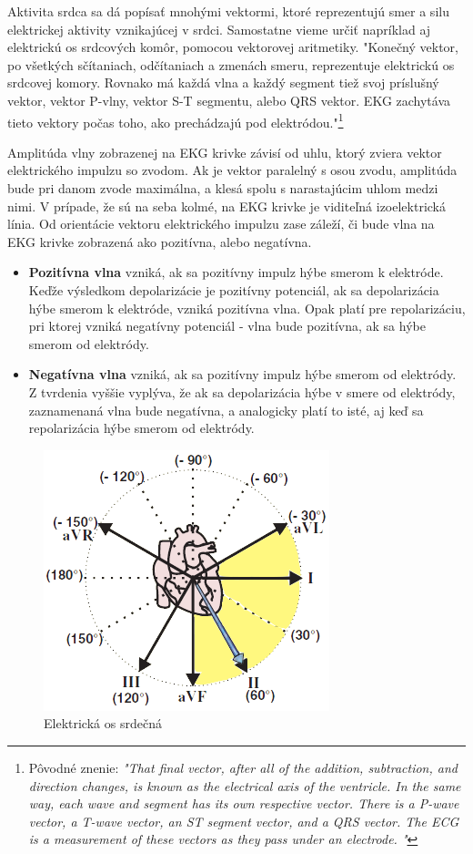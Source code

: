 Aktivita srdca sa dá popísať mnohými vektormi, ktoré reprezentujú smer a silu elektrickej aktivity vznikajúcej v srdci. Samostatne vieme určiť napríklad aj elektrickú os srdcových komôr, pomocou vektorovej aritmetiky. "Konečný vektor, po všetkých sčítaniach, odčítaniach a zmenách smeru, reprezentuje elektrickú os srdcovej komory. Rovnako má každá vlna a každý segment tiež svoj príslušný vektor, vektor P-vlny, vektor S-T segmentu, alebo QRS vektor. EKG zachytáva tieto vektory počas toho, ako prechádzajú pod elektródou."\footnote{Pôvodné znenie: \textit{"That final vector, after all of the addition, subtraction, and direction changes, is known as the electrical axis of the ventricle. In the same way, each wave and segment has its own respective vector. There is a P-wave vector, a T-wave vector, an ST segment vector, and a QRS vector. The ECG is a measurement of these vectors as they pass under an electrode. "}}\cite{garcia201512}

Amplitúda vlny zobrazenej na EKG krivke závisí od uhlu, ktorý zviera vektor elektrického impulzu so zvodom. Ak je vektor paralelný s osou zvodu, amplitúda bude pri danom zvode maximálna, a klesá spolu s narastajúcim uhlom medzi nimi. V prípade, že sú na seba kolmé, na EKG krivke je viditeľná izoelektrická línia. Od orientácie vektoru elektrického impulzu zase záleží, či bude vlna na EKG krivke zobrazená ako pozitívna, alebo negatívna. 
\begin{itemize}
    \item \textbf{Pozitívna vlna} vzniká, ak sa pozitívny impulz hýbe smerom k elektróde. Keďže výsledkom depolarizácie je pozitívny potenciál, ak sa depolarizácia hýbe smerom k elektróde, vzniká pozitívna vlna. Opak platí pre repolarizáciu, pri ktorej vzniká negatívny potenciál - vlna bude pozitívna, ak sa hýbe smerom od elektródy.
    \item \textbf{Negatívna vlna} vzniká, ak sa pozitívny impulz hýbe smerom od elektródy. Z tvrdenia vyššie vyplýva, že ak sa depolarizácia hýbe v smere od elektródy, zaznamenaná vlna bude negatívna, a analogicky platí to isté, aj keď sa repolarizácia hýbe smerom od elektródy.\cite{garcia201512}\cite{Euan_Niebauer_2004}
\end{itemize}

\begin{figure}[H]
    \centering
    \includegraphics[scale=0.6]{img/normal-axis.png}
    \caption{Elektrická os srdečná\cite{Blahút_2017b}}
    \label{fig:axis}
\end{figure}

